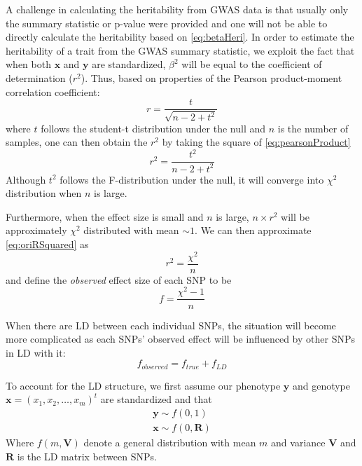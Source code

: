 			A challenge in calculating the heritability from \gls{GWAS} data is that usually only the summary statistic or p-value were provided and one will not be able to directly calculate the heritability based on \cref{eq:betaHeri}. 
			In order to estimate the heritability of a trait from the \gls{GWAS} summary statistic, we exploit the fact that when both $\boldsymbol{x}$ and $\boldsymbol{y}$ are standardized, $\beta^2$ will be equal to the coefficient of determination ($r^2$). 
			Thus, based on properties of the Pearson product-moment correlation coefficient:
			\begin{equation}
				r = \frac{t}{\sqrt{n-2+t^2}}
				\label{eq:pearsonProduct}
			\end{equation}
			where $t$ follows the student-t distribution under the null and $n$ is the number of samples, one can then obtain the $r^2$ by taking the square of \cref{eq:pearsonProduct}
			\begin{equation}
				r^2 = \frac{t^2}{n-2+t^2}
				\label{eq:oriRSquared}
			\end{equation}
			Although $t^2$ follows the F-distribution under the null, it will converge into $\chi^2$ distribution when $n$ is large.
			
			Furthermore, when the effect size is small and $n$ is large, $n\times r^2$ will be approximately $\chi^2$ distributed with mean $\sim 1$. 
			We can then approximate \cref{eq:oriRSquared} as
			\begin{equation}
				r^2= \frac{\chi^2}{n}
				\label{eq:approxChi}
			\end{equation}
			and define the \emph{observed} effect size of each \gls{SNP} to be
			\begin{equation}
			f=\frac{\chi^2-1}{n}
			\label{eq:observedEffect}
			\end{equation}
			
			When there are \gls{LD} between each individual \glspl{SNP}, the situation will become more complicated as each \glspl{SNP}' observed effect will be influenced by other \glspl{SNP} in \gls{LD} with it:
			\begin{equation}
			f_{observed} = f_{true}+f_{LD}
			\label{eq:conceptF}
			\end{equation}
			
			To account for the \gls{LD} structure, we first assume our phenotype $\boldsymbol{y}$ and genotype $\boldsymbol{x}=(x_1,x_2,\dots,x_m)^t$ are standardized and that
			\begin{align*}
				\boldsymbol{y}\sim f(0,1) \\
				\boldsymbol{x}\sim f(0,\boldsymbol{R})
			\end{align*}
			Where $f(m, \boldsymbol{V})$ denote a general distribution with mean $m$ and variance $\boldsymbol{V}$ and $\boldsymbol{R}$ is the \gls{LD} matrix between \glspl{SNP}.
			
